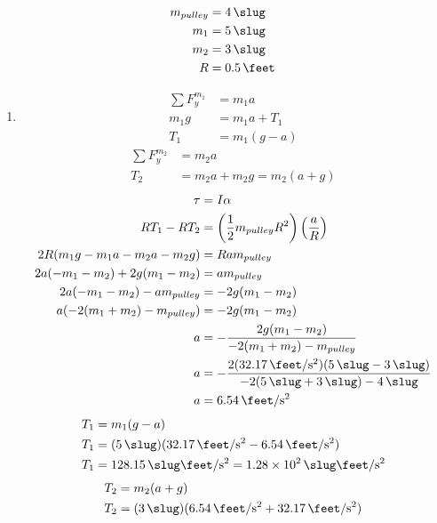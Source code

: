 \documentclass{article}
\begin{document}
\begin{align*}
	m_{pulley} & = \SI{4}{\slug} \\
	m_1 & = \SI{5}{\slug} \\
	m_2 & = \SI{3}{\slug} \\
	R & = \SI{0.5}{\feet}
\end{align*}
\begin{enumerate}[label = \boldalpha]
	\item
		\begin{align*}
			\sum F_y^{m_1} & = m_1a \\
			m_1g & = m_1a + T_1 \\
			T_1 & = m_1(g - a)
		\end{align*}
		\begin{align*}
			\sum F_y^{m_2} & = m_2a \\
			T_2 & = m_2a + m_2g = m_2(a + g)
		\end{align*}
		\begin{align*}
			\tau & = I\alpha \\
			RT_1 - RT_2 & = \left( \frac{1}{2}m_{pulley}R^2 \right) \left( \frac{a}{R} \right) \\
			2R(m_1g - m_1a - m_2a - m_2g) & = Ram_{pulley} \\
			2a(-m_1 - m_2) + 2g(m_1 - m_2) & = am_{pulley} \\
			2a(-m_1 - m_2) - am_{pulley} & = -2g(m_1 - m_2) \\
			a(-2(m_1 + m_2) - m_{pulley}) & = -2g(m_1 - m_2) \\
			a & = -\frac{ 2g(m_1 - m_2) }{ -2(m_1 + m_2) - m_{pulley} } \\
			a & = -\frac{ 2(\SI{32.17}{\feet \per \second \squared})(\SI{5}{\slug} - \SI{3}{\slug}) }{ -2(\SI{5}{\slug} + \SI{3}{\slug}) - \SI{4}{\slug} } \\
			a & = \SI{6.54}{\feet \per \second \squared}
		\end{align*}
		\begin{align*}
			T_1 & = m_1(g - a) \\
			T_1 & = (\SI{5}{\slug})(\SI{32.17}{\feet \per \second \squared} - \SI{6.54}{\feet \per \second \squared}) \\
			T_1 & = \SI{128.15}{\slug \feet \per \second \squared} = \SI{1.28e2}{\slug \feet \per \second \squared}
		\end{align*}
		\begin{align*}
			T_2 & = m_2(a + g) \\
			T_2 & = (\SI{3}{\slug})(\SI{6.54}{\feet \per \second \squared} + \SI{32.17}{\feet \per \second \squared}) \\

\end{align*}
\end{enumerate}
\end{document}
